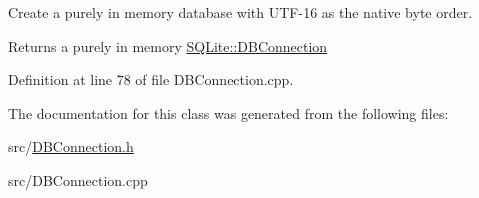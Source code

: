 Create a purely in memory database with U\-T\-F-\/16 as the native byte order. 

\begin{DoxyReturn}{Returns}
a purely in memory \hyperlink{a00004}{S\-Q\-Lite\-::\-D\-B\-Connection} 
\end{DoxyReturn}


Definition at line 78 of file D\-B\-Connection.\-cpp.



The documentation for this class was generated from the following files\-:\begin{DoxyCompactItemize}
\item 
src/\hyperlink{a00022}{D\-B\-Connection.\-h}\item 
src/D\-B\-Connection.\-cpp\end{DoxyCompactItemize}

